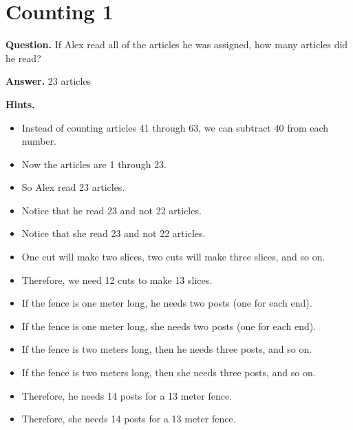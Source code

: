 \documentclass{article}
\begin{document}
\section*{Counting 1}
\textbf{Question.} If Alex read all of the articles he was assigned, how many articles did he read?

\textbf{Answer.} 23 articles

\textbf{Hints.}
\begin{itemize}
  \item Instead of counting articles 41 through 63,
                        we can subtract 40 from each number.
  \item Now the articles are 1 through 23.
  \item So Alex read 23 articles.
  \item Notice that he read 23 and not 22 articles.
  \item Notice that she read 23 and not 22 articles.
  \item One cut will make two slices, two cuts will make three slices, and so on.
  \item Therefore, we need 12 cuts to make 13 slices.
  \item If the fence is one meter long, he needs two posts (one for each end).
  \item If the fence is one meter long, she needs two posts (one for each end).
  \item If the fence is two meters long, then he needs three posts, and so on.
  \item If the fence is two meters long, then she needs three posts, and so on.
  \item Therefore, he needs 14 posts for a 13 meter fence.
  \item Therefore, she needs 14 posts for a 13 meter fence.
\end{itemize}
\end{document}
